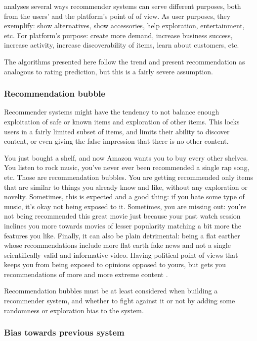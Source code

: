 \citet{recpurpose} analyses several ways recommender systems can serve different purposes, both from the users' and the platform's point of of view. As user purposes, they exemplify: show alternatives, show accessories, help exploration, entertainment, etc. For platform's purpose: create more demand, increase business success, increase activity, increase discoverability of items, learn about customers, etc.

The algorithms presented here follow the trend and present recommendation as analogous to rating prediction, but this is a fairly severe assumption.

\subsubsection{Recommendation bubble}

Recommender systems might have the tendency to not balance enough exploitation of safe or known items and exploration of other items. This locks users in a fairly limited subset of items, and limits their ability to discover content, or even giving the false impression that there is no other content.

You just bought a shelf, and now Amazon wants you to buy every other shelves. You listen to rock music, you've never ever been recommended a single rap song, etc. Those are recommendation bubbles. You are getting recommended only items that are similar to things you already know and like, without any exploration or novelty. Sometimes, this is expected and a good thing: if you hate some type of music, it's okay not being exposed to it. Sometimes, you are missing out: you're not being recommended this great movie just because your past watch session inclines you more towards movies of lesser popularity matching a bit more the features you like. Finally, it can also be plain detrimental: being a flat earther whose recommendations include more flat earth fake news and not a single scientifically valid and informative video. Having political point of views that keeps you from being exposed to opinions opposed to yours, but gets you recommendations of more and more extreme content  \citep{filterbubble, filterbubblebook}.

Recommendation bubbles must be at least considered when building a recommender system, and whether to fight against it or not by adding some randomness or exploration bias to the system.

\subsubsection{Bias towards previous system}

